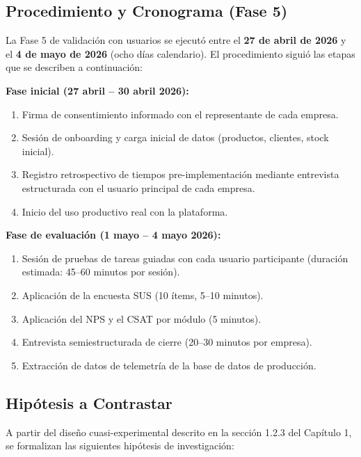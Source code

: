 \subsection{Procedimiento y Cronograma (Fase 5)}\label{procedimiento-y-cronograma-fase-5}

La Fase 5 de validación con usuarios se ejecutó entre el \textbf{27 de abril de 2026} y el \textbf{4 de mayo de 2026} (ocho días calendario). El procedimiento siguió las etapas que se describen a continuación:

\textbf{Fase inicial (27 abril -- 30 abril 2026):}

\begin{enumerate}
\def\labelenumi{\arabic{enumi}.}
\tightlist
\item
  Firma de consentimiento informado con el representante de cada empresa.
\item
  Sesión de onboarding y carga inicial de datos (productos, clientes, stock inicial).
\item
  Registro retrospectivo de tiempos pre-implementación mediante entrevista estructurada con el usuario principal de cada empresa.
\item
  Inicio del uso productivo real con la plataforma.
\end{enumerate}

\textbf{Fase de evaluación (1 mayo -- 4 mayo 2026):}

\begin{enumerate}
\def\labelenumi{\arabic{enumi}.}
\tightlist
\item
  Sesión de pruebas de tareas guiadas con cada usuario participante (duración estimada: 45--60 minutos por sesión).
\item
  Aplicación de la encuesta SUS (10 ítems, 5--10 minutos).
\item
  Aplicación del NPS y el CSAT por módulo (5 minutos).
\item
  Entrevista semiestructurada de cierre (20--30 minutos por empresa).
\item
  Extracción de datos de telemetría de la base de datos de producción.
\end{enumerate}

\subsection{Hipótesis a Contrastar}\label{hipuxf3tesis-a-contrastar}

A partir del diseño cuasi-experimental descrito en la sección 1.2.3 del Capítulo 1, se formalizan las siguientes hipótesis de investigación:

